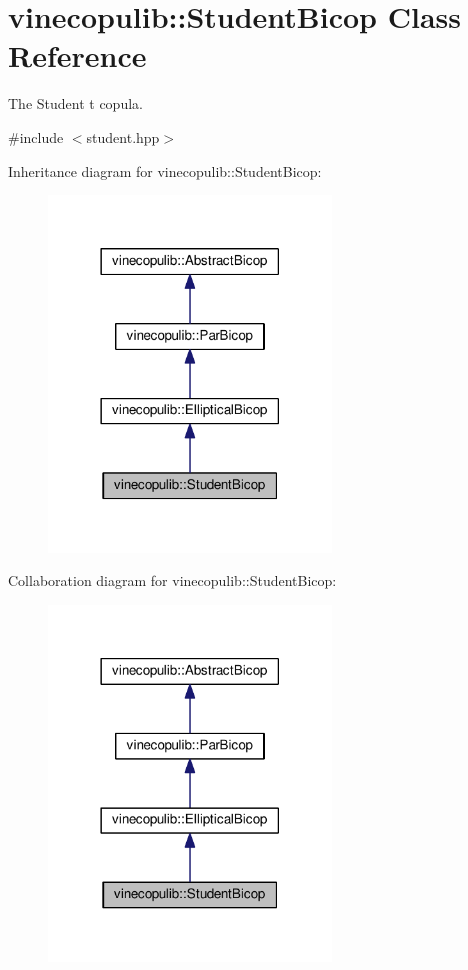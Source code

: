 \hypertarget{classvinecopulib_1_1_student_bicop}{}\section{vinecopulib\+:\+:Student\+Bicop Class Reference}
\label{classvinecopulib_1_1_student_bicop}


The Student t copula.  




{\ttfamily \#include $<$student.\+hpp$>$}



Inheritance diagram for vinecopulib\+:\+:Student\+Bicop\+:
\nopagebreak
\begin{figure}[H]
\begin{center}
\leavevmode
\includegraphics[width=213pt]{classvinecopulib_1_1_student_bicop__inherit__graph}
\end{center}
\end{figure}


Collaboration diagram for vinecopulib\+:\+:Student\+Bicop\+:
\nopagebreak
\begin{figure}[H]
\begin{center}
\leavevmode
\includegraphics[width=213pt]{classvinecopulib_1_1_student_bicop__coll__graph}
\end{center}
\end{figure}
